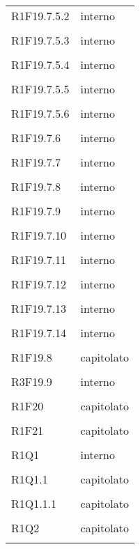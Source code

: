 \documentclass[a4paper]{article}
\begin{document}
\begin{longtable}{ >{\centering}p{}
		>{\centering}p{}}
	R1F19.7.5.2 & interno\\\tabularnewline
	
	R1F19.7.5.3 & interno\\\tabularnewline
	
	R1F19.7.5.4 & interno\\\tabularnewline
	
	R1F19.7.5.5 & interno\\\tabularnewline
	
	R1F19.7.5.6 & interno\\\tabularnewline
	
	R1F19.7.6 & interno\\\tabularnewline
	
	R1F19.7.7 & interno\\\tabularnewline
	
	R1F19.7.8 & interno\\\tabularnewline
	
	R1F19.7.9 & interno\\\tabularnewline
	
	R1F19.7.10 & interno\\\tabularnewline
	
	R1F19.7.11 & interno\\\tabularnewline
	
	R1F19.7.12 & interno\\\tabularnewline
	
	R1F19.7.13 & interno\\\tabularnewline
	
	R1F19.7.14 & interno\\\tabularnewline
	
	R1F19.8 & capitolato\\\tabularnewline
	
	R3F19.9 & interno\\\tabularnewline
	
	R1F20 & capitolato\\\tabularnewline
	
	R1F21 & capitolato\\\tabularnewline
	
	R1Q1 & interno\\\tabularnewline
	
	R1Q1.1 & capitolato\\\tabularnewline
	
	R1Q1.1.1 & capitolato\\\tabularnewline
	
	R1Q2 & capitolato\\\tabularnewline
	

\end{longtable}
\end{document}

